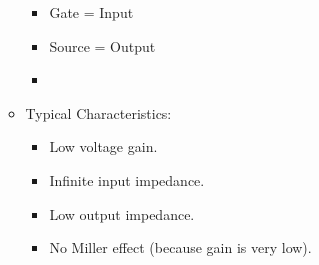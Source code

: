 \begin{multicols}{2}
\begin{CheatsheetEntryFrame}
\begin{itemize}
\begin{itemize}
                \begin{itemize}
                    \item Gate = Input
                    \item Source = Output
                    \item {}
                \end{itemize}
                \item Typical Characteristics:
                \begin{itemize}
                    \item Low voltage gain.
                    \item Infinite input impedance.
                    \item Low output impedance.
                    \item No Miller effect (because gain is very low).
                \end{itemize}
            \end{itemize}
        \end{itemize}


    \end{CheatsheetEntryFrame}

\end{multicols}

\newpage

\newcommand{\TmpCircuitTransformArrow}[2]{%
    \begin{tikzpicture}[scale=1, transform shape]
        \draw
            (0,0)
                node [simshadows/GenericGrayBlockArrow] {};
        ;
        \path (0,0) -- ++(0,#1);
        \path (0,0) -- ++(#2,0);
        \path (0,0) -- ++(-#2,0);
    \end{tikzpicture}%
}

